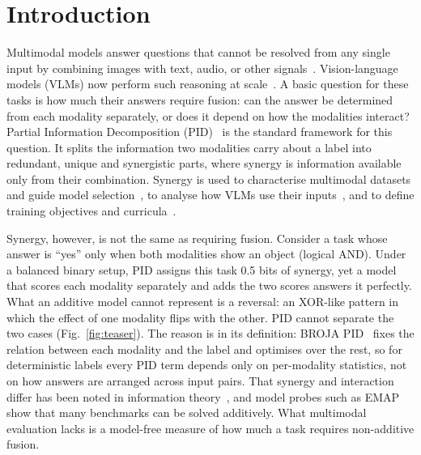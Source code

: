 \section{Introduction}
\label{sec:intro}
Multimodal models answer questions that cannot be resolved from any single input by combining images with text, audio,
or other signals~\cite{baltrusaitis2019multimodal,liang2024foundations}. Vision-language models (VLMs) now perform such
reasoning at scale~\cite{radford2021clip,alayrac2022flamingo,liu2023llava,bai2025qwen25vl}. A basic question for these
tasks is how much their answers require fusion: can the answer be determined from each modality separately, or does it
depend on how the modalities interact? Partial Information Decomposition (PID)~\cite{williams2010nonnegative,bertschinger2014quantifying}
is the standard framework for this question. It splits the information two modalities carry about a label into
redundant, unique and synergistic parts, where synergy is information available only from their combination. Synergy
is used to characterise multimodal datasets and guide model selection~\cite{liang2023quantifying,liang2024multimodal},
to analyse how VLMs use their inputs~\cite{xiu2026comprehensive,fang2026towards}, and to define training objectives
and curricula~\cite{kontras2026synib,yarici2026synco,singh2026spice}.

Synergy, however, is not the same as requiring fusion. Consider a task whose answer is ``yes'' only when both
modalities show an object (logical AND). Under a balanced binary setup, PID assigns this task 0.5 bits of synergy,
yet a model that scores each modality separately and adds the two scores answers it perfectly. What an additive model
cannot represent is a reversal: an XOR-like pattern in which the effect of one modality flips with the other. PID
cannot separate the two cases (Fig.~\ref{fig:teaser}). The reason is in its definition: BROJA PID~\cite{bertschinger2014quantifying}
fixes the relation between each modality and the label and optimises over the rest, so for deterministic labels every
PID term depends only on per-modality statistics, not on how answers are arranged across input pairs. That synergy and
interaction differ has been noted in information theory~\cite{james2019unique,jansma2023higher}, and model probes such
as EMAP~\cite{hessel2020does} show that many benchmarks can be solved additively. What multimodal evaluation lacks is a
model-free measure of how much a task requires non-additive fusion.

